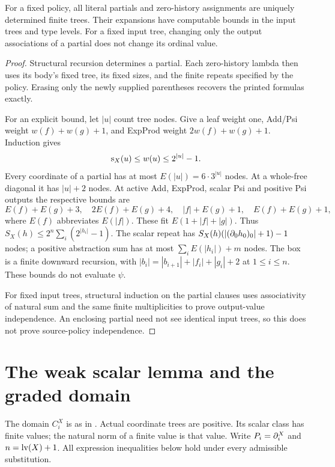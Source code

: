 \begin{proposition}\label{wwsc:prop:finite}
For a fixed policy, all literal partials and zero-history assignments
are uniquely determined finite trees. Their expansions have computable
bounds in the input trees and type levels. For a fixed input tree,
changing only the output associations of a partial does not change
its ordinal value.
\end{proposition}
\begin{proof}
Structural recursion determines a partial. Each zero-history lambda
then uses its body's fixed tree, its fixed sizes, and the finite
repeats specified by the policy. Erasing only the newly supplied
parentheses recovers the printed formulas exactly.

For an explicit bound, let $|u|$ count tree nodes. Give a leaf weight
one, Add/Psi weight $w(f)+w(g)+1$, and ExpProd weight
$2w(f)+w(g)+1$. Induction gives
\[
 \operatorname{s}_X(u)\le w(u)\le2^{|u|}-1.
\]
Every coordinate of a partial has at most $E(|u|)=6\cdot3^{|u|}$ nodes.
At a whole-free diagonal it has $|u|+2$ nodes. At active Add, ExpProd,
scalar Psi and positive Psi outputs the respective bounds are
\[
 E(f)+E(g)+3,\quad 2E(f)+E(g)+4,\quad
 |f|+E(g)+1,\quad E(f)+E(g)+1,
\]
where $E(f)$ abbreviates $E(|f|)$. These fit $E(1+|f|+|g|)$.
Thus $S_X(h)\le2^n\sum_i(2^{|h_i|}-1)$. The scalar repeat has
$S_X(h)(|(\partial_0h_0)_0|+1)-1$ nodes; a positive abstraction sum has
at most $\sum_i E(|h_i|)+m$ nodes. The box is a finite downward
recursion, with $|b_i|=|b_{i+1}|+|f_i|+|g_i|+2$ at $1\le i\le n$.
These bounds do not evaluate $\psi$.

For fixed input trees, structural induction on the partial clauses
uses associativity of natural sum and the same finite multiplicities
to prove output-value independence. An enclosing partial need not see
identical input trees, so this does not prove source-policy independence.
\end{proof}

\section{The weak scalar lemma and the graded domain}

The domain $C_i^X$ is as in \cite[Definition~2.9]{ww}. Actual coordinate
trees are positive. Its scalar class has finite values; the natural norm
of a finite value is that value. Write $P_i=\partial_i^X$ and $n=\operatorname{lv}(X)+1$.
All expression inequalities below hold under every admissible substitution.


